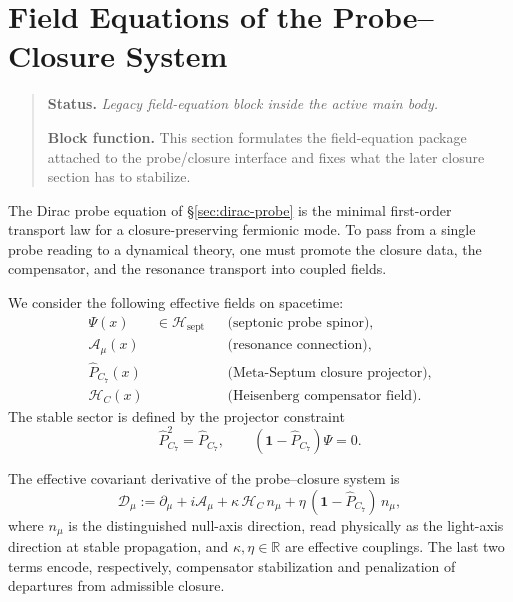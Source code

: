\section{Field Equations of the Probe--Closure System}
\begin{quote}\small
\noindent\textbf{Status.} \emph{Legacy field-equation block inside the active main body.}\par
\noindent\textbf{Block function.} This section formulates the field-equation package attached to the probe/closure interface and fixes what the later closure section has to stabilize.
\end{quote}
\label{sec:field-eq}

\begin{remark}
The Dirac probe equation of \S\ref{sec:dirac-probe} is the minimal
first-order transport law for a closure-preserving fermionic mode.
To pass from a single probe reading to a dynamical theory, one must
promote the closure data, the compensator, and the resonance transport
into coupled fields.
\end{remark}

\begin{definition}
We consider the following effective fields on spacetime:
\begin{align*}
  \Psi(x) &\in \mathcal H_{\mathrm{sept}}
    &&\text{(septonic probe spinor)},\\
  \mathcal A_\mu(x)
    &&&\text{(resonance connection)},\\
  \hat P_{C_7}(x)
    &&&\text{(Meta-Septum closure projector)},\\
  \mathcal H_C(x)
    &&&\text{(Heisenberg compensator field)}.
\end{align*}
The stable sector is defined by the projector constraint
\[
  \hat P_{C_7}^2 = \hat P_{C_7},
  \qquad
  (\mathbf 1-\hat P_{C_7})\Psi = 0.
\]
\end{definition}

\begin{definition}
The effective covariant derivative of the probe--closure system is
\[
  \mathcal D_\mu
  :=
  \partial_\mu
  + i\mathcal A_\mu
  + \kappa\,\mathcal H_C\,n_\mu
  + \eta\,(\mathbf 1-\hat P_{C_7})\,n_\mu,
\]
where $n_\mu$ is the distinguished null-axis direction, read physically as the light-axis direction at stable propagation, and
$\kappa,\eta\in\mathbb R$ are effective couplings.
The last two terms encode, respectively, compensator stabilization and
penalization of departures from admissible closure.
\end{definition}

